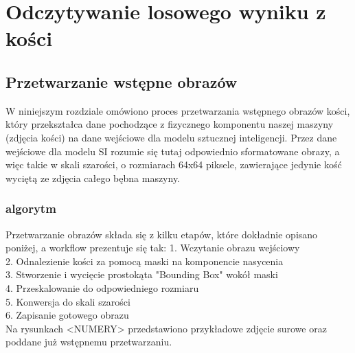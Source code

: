 \chapter{Odczytywanie losowego wyniku z kości}

\section{Przetwarzanie wstępne obrazów}

W niniejszym rozdziale omówiono proces przetwarzania wstępnego obrazów kości,
który przekształca dane pochodzące z fizycznego komponentu naszej maszyny (zdjęcia kości) na dane wejściowe dla modelu sztucznej inteligencji.
Przez dane wejściowe dla modelu SI rozumie się tutaj odpowiednio sformatowane obrazy, a więc takie w skali szarości,
o rozmiarach 64x64 piksele, zawierające jedynie kość wyciętą ze zdjęcia całego bębna maszyny.

\subsection{algorytm}

Przetwarzanie obrazów składa się z kilku etapów, które dokładnie opisano poniżej, a workflow prezentuje się tak:
1. Wczytanie obrazu wejściowy \\
2. Odnalezienie kości za pomocą maski na komponencie nasycenia \\
3. Stworzenie i wycięcie prostokąta "Bounding Box" wokół maski \\
4. Przeskalowanie do odpowiedniego rozmiaru \\
5. Konwersja do skali szarości \\
6. Zapisanie gotowego obrazu \\

Na rysunkach <NUMERY> przedstawiono przykładowe zdjęcie surowe oraz poddane już wstępnemu przetwarzaniu.


